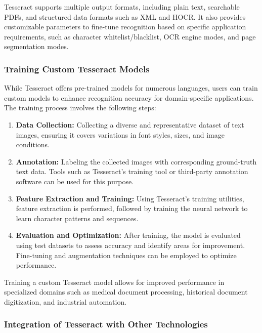 Tesseract supports multiple output formats, including plain text, searchable PDFs, and structured data formats such as XML and HOCR. It also provides customizable parameters to fine-tune recognition based on specific application requirements, such as character whitelist/blacklist, OCR engine modes, and page segmentation modes.

\subsubsection{Training Custom Tesseract Models}

While Tesseract offers pre-trained models for numerous languages, users can train custom models to enhance recognition accuracy for domain-specific applications. The training process involves the following steps:

\begin{enumerate}
    \item \textbf{Data Collection:} Collecting a diverse and representative dataset of text images, ensuring it covers variations in font styles, sizes, and image conditions.
    
    \item \textbf{Annotation:} Labeling the collected images with corresponding ground-truth text data. Tools such as Tesseract's training tool or third-party annotation software can be used for this purpose.
    
    \item \textbf{Feature Extraction and Training:} Using Tesseract's training utilities, feature extraction is performed, followed by training the neural network to learn character patterns and sequences.
    
    \item \textbf{Evaluation and Optimization:} After training, the model is evaluated using test datasets to assess accuracy and identify areas for improvement. Fine-tuning and augmentation techniques can be employed to optimize performance.
\end{enumerate}

Training a custom Tesseract model allows for improved performance in specialized domains such as medical document processing, historical document digitization, and industrial automation.

\subsubsection{Integration of Tesseract with Other Technologies}

